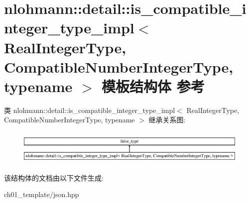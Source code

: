 \hypertarget{structnlohmann_1_1detail_1_1is__compatible__integer__type__impl}{}\section{nlohmann\+::detail\+::is\+\_\+compatible\+\_\+integer\+\_\+type\+\_\+impl$<$ Real\+Integer\+Type, Compatible\+Number\+Integer\+Type, typename $>$ 模板结构体 参考}
\label{structnlohmann_1_1detail_1_1is__compatible__integer__type__impl}
类 nlohmann\+::detail\+::is\+\_\+compatible\+\_\+integer\+\_\+type\+\_\+impl$<$ Real\+Integer\+Type, Compatible\+Number\+Integer\+Type, typename $>$ 继承关系图\+:\begin{figure}[H]
\begin{center}
\leavevmode
\includegraphics[height=1.699545cm]{structnlohmann_1_1detail_1_1is__compatible__integer__type__impl}
\end{center}
\end{figure}


该结构体的文档由以下文件生成\+:\begin{DoxyCompactItemize}
\item 
ch01\+\_\+template/json.\+hpp\end{DoxyCompactItemize}
